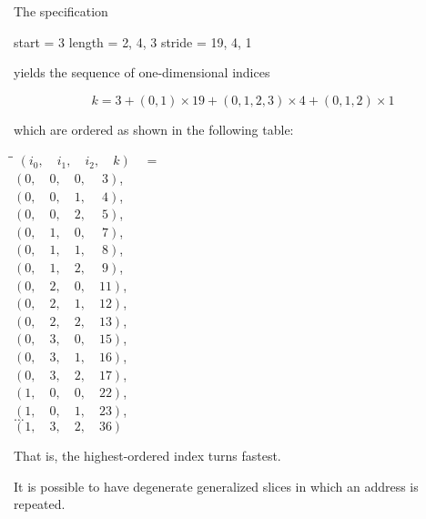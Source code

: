 \pnum
\begin{example}
The
specification
\begin{codeblock}
start  = 3
length = {2, 4, 3}
stride = {19, 4, 1}
\end{codeblock}
yields the sequence of one-dimensional indices

$$k = 3 + (0,1) \times 19 + (0,1,2,3) \times 4 + (0,1,2) \times 1$$

which are ordered as shown in the following table:

\begin{tabbing}
\hspace{.5in}\=\hspace{.4in}\=\kill%
\>$(i_0,\quad i_1,\quad i_2,\quad k)\quad =$\\
\>\>$(0,\quad 0,\quad 0,\quad \ 3)$,    \\
\>\>$(0,\quad 0,\quad 1,\quad \ 4)$,    \\
\>\>$(0,\quad 0,\quad 2,\quad \ 5)$,    \\
\>\>$(0,\quad 1,\quad 0,\quad \ 7)$,    \\
\>\>$(0,\quad 1,\quad 1,\quad \ 8)$,    \\
\>\>$(0,\quad 1,\quad 2,\quad \ 9)$,    \\
\>\>$(0,\quad 2,\quad 0,\quad 11)$, \\
\>\>$(0,\quad 2,\quad 1,\quad 12)$, \\
\>\>$(0,\quad 2,\quad 2,\quad 13)$, \\
\>\>$(0,\quad 3,\quad 0,\quad 15)$, \\
\>\>$(0,\quad 3,\quad 1,\quad 16)$, \\
\>\>$(0,\quad 3,\quad 2,\quad 17)$, \\
\>\>$(1,\quad 0,\quad 0,\quad 22)$, \\
\>\>$(1,\quad 0,\quad 1,\quad 23)$, \\
\>\>$\ldots$      \\
\>\>$(1,\quad 3,\quad 2,\quad 36)$
\end{tabbing}

That is, the highest-ordered index turns fastest.
\end{example}

\pnum
It is possible to have degenerate generalized slices in which an address
is repeated.

